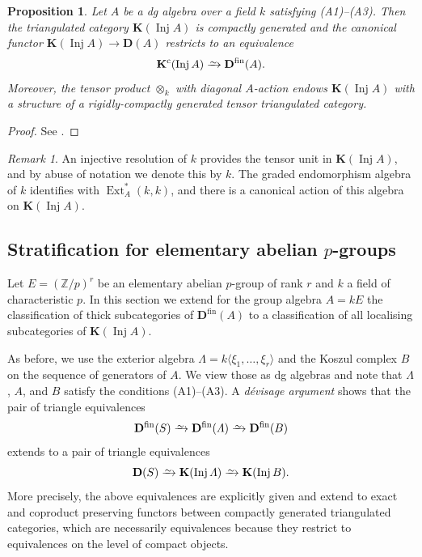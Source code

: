 \documentclass{amsart}[a4]
\newtheorem{proposition}[theorem]{Proposition}
\theoremstyle{definition}
\theoremstyle{remark}
\newtheorem{remark}[theorem]{Remark}
\numberwithin{equation}{section}
\newcommand{\Ext}{\operatorname{Ext}}
\newcommand{\Inj}{\operatorname{Inj}}
\newcommand{\iso}{\xrightarrow{\raisebox{-.6ex}[0ex][0ex]{$\scriptstyle{\sim}$}}}
\newcommand{\fin}{\mathrm{fin}}
\newcommand{\bfD}{\mathbf D}
\newcommand{\bfK}{\mathbf K}
\newcommand{\bbZ}{\mathbb Z}
\let\Lambda\varLambda
\begin{document}
\begin{proposition}
  Let $A$ be a dg algebra over a field $k$ satisfying
  \emph{(A1)--(A3)}. Then the triangulated category $\bfK(\Inj A)$ is
  compactly generated and the canonical functor
  $\bfK(\Inj A)\to\bfD(A)$ restricts to an equivalence
  \[\bfK^{\mathrm c}(\Inj A)\iso\bfD^\fin(A).\] Moreover, the tensor product
  $\otimes_k$ with diagonal $A$-action endows $\bfK(\Inj A)$ with a
  structure of a rigidly-compactly generated tensor triangulated
  category.
\end{proposition}
\begin{proof}
  See \cite[\S4]{Benson/Iyengar/Krause:2011b}.
\end{proof}

\begin{remark}
  An injective resolution of $k$ provides the tensor unit in
  $\bfK(\Inj A)$, and by abuse of notation we denote this by $k$. The
  graded endomorphism algebra of $k$ identifies with  $\Ext^*_A(k,k)$,
  and  there is a canonical action of this algebra on $\bfK(\Inj A)$.
\end{remark}

  

\subsection*{Stratification for elementary abelian $p$-groups}

Let $E=(\bbZ/p)^r$ be an elementary abelian $p$-group of rank $r$ and
$k$ a field of characteristic $p$. In this section we extend for the
group algebra $A=kE$ the classification of thick subcategories of
$\bfD^\fin(A)$ to a classification of all localising subcategories of
$\bfK(\Inj A)$.

As before, we use the exterior algebra
$\Lambda=k\langle\xi_1,\ldots,\xi_r\rangle$ and the Koszul complex $B$
on the sequence of generators of $A$.  We view those as dg algebras
and note that $\Lambda$, $A$, and $B$ satisfy the conditions
(A1)--(A3). A \emph{d\'evisage argument} shows that the pair of
triangle equivalences
\[\bfD^\fin(S)\iso\bfD^\fin(\Lambda)\iso \bfD^\fin(B)\] extends
to a pair of triangle equivalences
\[\bfD(S)\iso\bfK(\Inj\Lambda)\iso \bfK(\Inj B).\]
More precisely, the above equivalences are explicitly given and extend
to exact and coproduct preserving functors between compactly generated
triangulated categories, which are necessarily equivalences because
they restrict to equivalences on the level of compact objects.
\end{document}
